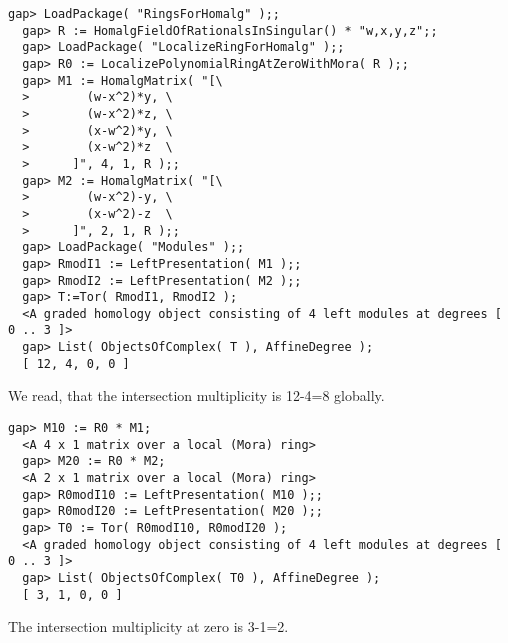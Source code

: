 \documentclass[a4paper,11pt]{report}
\begin{document}
{{\begin{Verbatim}[fontsize=\small,frame=single,label=Example]
  gap> LoadPackage( "RingsForHomalg" );;
  gap> R := HomalgFieldOfRationalsInSingular() * "w,x,y,z";;
  gap> LoadPackage( "LocalizeRingForHomalg" );;
  gap> R0 := LocalizePolynomialRingAtZeroWithMora( R );;
  gap> M1 := HomalgMatrix( "[\
  >        (w-x^2)*y, \
  >        (w-x^2)*z, \
  >        (x-w^2)*y, \
  >        (x-w^2)*z  \
  >      ]", 4, 1, R );;
  gap> M2 := HomalgMatrix( "[\
  >        (w-x^2)-y, \
  >        (x-w^2)-z  \
  >      ]", 2, 1, R );;
  gap> LoadPackage( "Modules" );;
  gap> RmodI1 := LeftPresentation( M1 );;
  gap> RmodI2 := LeftPresentation( M2 );;
  gap> T:=Tor( RmodI1, RmodI2 );
  <A graded homology object consisting of 4 left modules at degrees [ 0 .. 3 ]>
  gap> List( ObjectsOfComplex( T ), AffineDegree );
  [ 12, 4, 0, 0 ]
\end{Verbatim}
 We read, that the intersection multiplicity is 12-4=8 globally. 
\begin{Verbatim}[fontsize=\small,frame=single,label=Example]
  gap> M10 := R0 * M1;
  <A 4 x 1 matrix over a local (Mora) ring>
  gap> M20 := R0 * M2;
  <A 2 x 1 matrix over a local (Mora) ring>
  gap> R0modI10 := LeftPresentation( M10 );;
  gap> R0modI20 := LeftPresentation( M20 );;
  gap> T0 := Tor( R0modI10, R0modI20 );
  <A graded homology object consisting of 4 left modules at degrees [ 0 .. 3 ]>
  gap> List( ObjectsOfComplex( T0 ), AffineDegree );
  [ 3, 1, 0, 0 ]
\end{Verbatim}
 The intersection multiplicity at zero is 3-1=2. }

  }

 

\appendix
\end{document}
